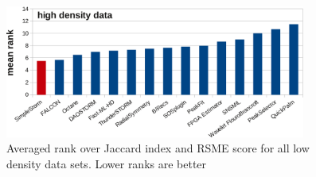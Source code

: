 \begin{figure}
\centering
\includegraphics[width = 0.88\textwidth]{pictures/diagrammsChallenge/MeanRankHighDensityCropped.pdf}
	\caption{Averaged rank over Jaccard index and RSME score for all low density data sets. Lower ranks are better}
	\label{meanRankHigh}
\end{figure}